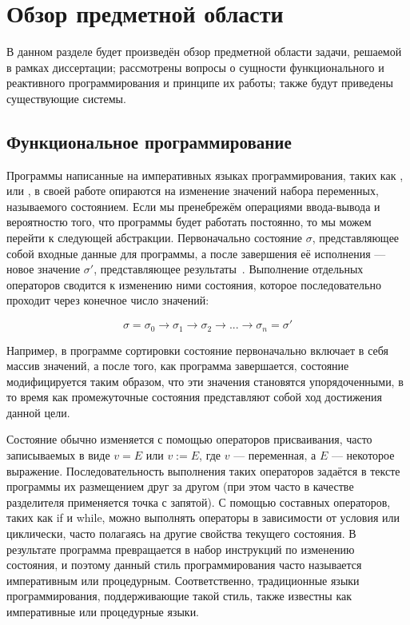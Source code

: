 \section{Обзор предметной области}
\label{sec:domain}

В данном разделе будет произведён обзор предметной области задачи, решаемой в рамках диссертации; рассмотрены вопросы о сущности функционального и реактивного программирования и принципе их работы; также будут приведены существующие системы.

\subsection{Функциональное программирование}
\label{sub:domain:functional_programming}

Программы написанные на императивных языках программирования, таких как \csharp{}, \java{} или \cpp{}, в своей работе опираются на изменение значений набора переменных, называемого состоянием. Если мы пренебрежём операциями ввода-вывода и вероятностю того, что программы будет работать постоянно, то мы можем перейти к следующей абстракции. Первоначально состояние $\sigma$, представляющее собой входные данные для программы, а после завершения её исполнения --- новое значение $\sigma'$, представляющее результаты~\cite{intro2fp}. Выполнение отдельных операторов сводится к изменению ними состояния, которое последовательно проходит через конечное число значений:

\begin{equation}
  \label{eq:domain:states_transition}
  \sigma = \sigma_{0} \rightarrow \sigma_{1} \rightarrow \sigma_{2} \rightarrow ... \rightarrow \sigma_{n} = \sigma'
\end{equation}

Например, в программе сортировки состояние первоначально включает в себя массив значений, а после того, как программа завершается, состояние модифицируется таким образом, что эти значения становятся упорядоченными, в то время как промежуточные состояния представляют собой ход достижения данной цели.

Состояние обычно изменяется с помощью операторов присваивания, часто записываемых в виде $v = E$ или $v := E$, где $v$ --- переменная, а $E$ --- некоторое выражение. Последовательность выполнения таких операторов задаётся в тексте программы их размещением друг за другом (при этом часто в качестве разделителя применяется точка с запятой). С помощью составных операторов, таких как if и while, можно выполнять операторы в зависимости от условия или циклически, часто полагаясь на другие свойства текущего состояния. В результате программа превращается в набор инструкций по изменению состояния, и поэтому данный стиль программирования часто называется императивным или процедурным. Соответственно, традиционные языки программирования, поддерживающие такой стиль, также известны как императивные или процедурные языки.

